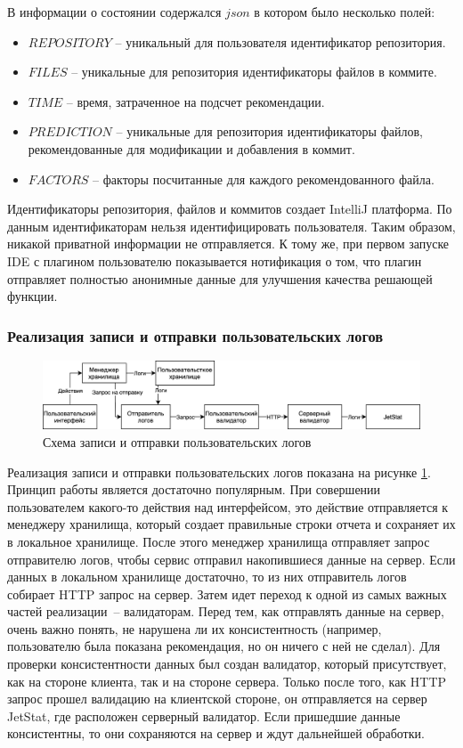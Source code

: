 \documentclass[times]{itmo-student-thesis}
\begin{document}
В информации о состоянии содержался $json$ в котором было несколько полей:
    \begin{itemize}[label={\textbullet}]
        \item $REPOSITORY$ -- уникальный для пользователя идентификатор репозитория.
        \item $FILES$ -- уникальные для репозитория идентификаторы файлов в коммите.
        \item $TIME$ -- время, затраченное на подсчет рекомендации.
        \item $PREDICTION$ -- уникальные для репозитория идентификаторы файлов, рекомендованные для модификации и добавления в коммит.
        \item $FACTORS$ -- факторы посчитанные для каждого рекомендованного файла.
    \end{itemize}
Идентификаторы репозитория, файлов и коммитов создает IntelliJ платформа. По данным идентификаторам нельзя идентифицировать пользователя. Таким образом, никакой приватной информации не отправляется. К тому же, при первом запуске IDE с плагином пользователю показывается нотификация о том, что плагин отправляет полностью анонимные данные для улучшения качества решающей функции.
\subsubsection{Реализация записи и отправки пользовательских логов}
\begin{figure}[!h]
\caption{Схема записи и отправки пользовательских логов}\label{jet-stat-logs}
\centering
\includegraphics[scale=0.2]{JetStat.png}
\end{figure}
Реализация записи и отправки пользовательских логов показана на рисунке \ref{jet-stat-logs}. Принцип работы является достаточно популярным. При совершении пользователем какого-то действия над интерфейсом, это действие отправляется к менеджеру хранилища, который создает правильные строки отчета и сохраняет их в локальное хранилище. После этого менеджер хранилища отправляет запрос отправителю логов, чтобы сервис отправил накопившиеся данные на сервер. Если данных в локальном хранилище достаточно, то из них отправитель логов собирает HTTP запрос на сервер. Затем идет переход к одной из самых важных частей реализации~-- валидаторам. Перед тем, как отправлять данные на сервер, очень важно понять, не нарушена ли их консистентность (например, пользователю была показана рекомендация, но он ничего с ней не сделал). Для проверки консистентности данных был создан валидатор, который присутствует, как на стороне клиента, так и на стороне сервера. Только после того, как HTTP запрос прошел валидацию на клиентской стороне, он отправляется на сервер JetStat, где расположен серверный валидатор. Если пришедшие данные консистентны, то они сохраняются на сервер и ждут дальнейшей обработки.
\end{document}
